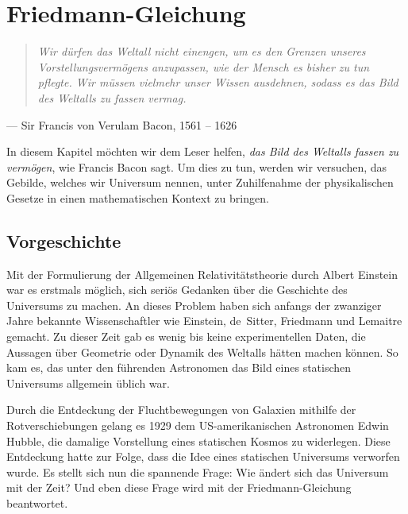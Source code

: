 \chapter{Friedmann-Gleichung\label{chapter:friedmann}}
\begin{refsection}
\rhead{}
\begin{quote}\it
Wir dürfen das Weltall nicht einengen, um es den Grenzen unseres
Vorstellungsvermögens anzupassen, wie der Mensch es bisher zu tun pflegte.
Wir müssen vielmehr unser Wissen ausdehnen, sodass es das Bild des Weltalls
zu fassen vermag.
\end{quote}
\begin{flushright}
--- Sir Francis von Verulam Bacon, 1561 -- 1626
%
\end{flushright}

In diesem Kapitel möchten wir dem Leser helfen,
{\em das Bild des Weltalls fassen zu vermögen}, wie Francis Bacon sagt.
Um dies zu tun, werden wir versuchen, das Gebilde, welches wir Universum nennen, unter Zuhilfenahme der physikalischen Gesetze in einen mathematischen Kontext zu bringen.

\section{Vorgeschichte}
Mit der Formulierung der Allgemeinen Relativitätstheorie durch Albert Einstein war es erstmals möglich,
sich seriös Gedanken über die Geschichte des
Universums zu machen. An dieses Problem haben sich anfangs der zwanziger Jahre bekannte Wissenschaftler wie Einstein, de~Sitter, Friedmann und Lemaitre gemacht. 
%
%
%
Zu dieser Zeit gab es wenig bis keine experimentellen Daten, die Aussagen über Geometrie oder Dynamik des Weltalls hätten machen können. So kam es, das unter den führenden Astronomen das Bild eines statischen Universums allgemein üblich war.

Durch die Entdeckung der Fluchtbewegungen von Galaxien mithilfe der Rotverschiebungen gelang es 1929 dem US-amerikanischen Astronomen Edwin Hubble, die damalige Vorstellung eines statischen Kosmos zu widerlegen. Diese Entdeckung hatte zur Folge, dass die Idee eines statischen Universums verworfen wurde. Es stellt sich nun die spannende Frage: Wie ändert sich das Universum mit der Zeit? Und eben diese Frage wird mit der Friedmann-Gleichung beantwortet.
\pagebreak


\end{refsection}
